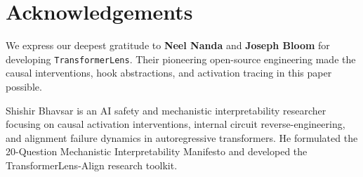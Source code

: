 \documentclass[journal,10pt,twocolumn]{IEEEtran}
\begin{document}
\section*{Acknowledgements}
We express our deepest gratitude to \textbf{Neel Nanda} and \textbf{Joseph Bloom} for developing \texttt{TransformerLens}. Their pioneering open-source engineering made the causal interventions, hook abstractions, and activation tracing in this paper possible.





\begin{IEEEbiographynophoto}{Shishir Bhavsar}
is an AI safety and mechanistic interpretability researcher focusing on causal activation interventions, internal circuit reverse-engineering, and alignment failure dynamics in autoregressive transformers. He formulated the 20-Question Mechanistic Interpretability Manifesto and developed the TransformerLens-Align research toolkit.
\end{IEEEbiographynophoto}
\end{document}
